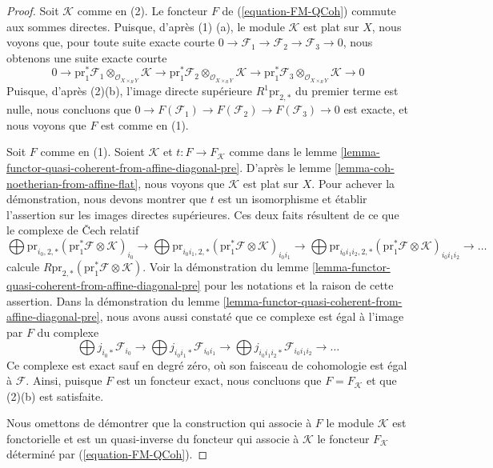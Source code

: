 \begin{proof}
Soit $\mathcal{K}$ comme en (2). Le foncteur $F$ de
(\ref{equation-FM-QCoh}) commute aux sommes directes.
Puisque, d'après (1) (a), le module $\mathcal{K}$ est plat sur $X$,
nous voyons que, pour toute suite exacte courte
$0 \to \mathcal{F}_1 \to \mathcal{F}_2 \to \mathcal{F}_3 \to 0$,
nous obtenons une suite exacte courte
$$
0 \to
\text{pr}_1^*\mathcal{F}_1 \otimes_{\mathcal{O}_{X \times_R Y}} \mathcal{K} \to
\text{pr}_1^*\mathcal{F}_2 \otimes_{\mathcal{O}_{X \times_R Y}} \mathcal{K} \to
\text{pr}_1^*\mathcal{F}_3 \otimes_{\mathcal{O}_{X \times_R Y}} \mathcal{K} \to
0
$$
Puisque, d'après (2)(b), l'image directe supérieure $R^1\text{pr}_{2, *}$
du premier terme est nulle, nous concluons que
$0 \to F(\mathcal{F}_1) \to F(\mathcal{F}_2) \to F(\mathcal{F}_3) \to 0$
est exacte, et nous voyons que $F$ est comme en (1).

\medskip\noindent
Soit $F$ comme en (1). Soient $\mathcal{K}$ et $t : F \to F_\mathcal{K}$ comme
dans le lemme \ref{lemma-functor-quasi-coherent-from-affine-diagonal-pre}.
D'après le lemme \ref{lemma-coh-noetherian-from-affine-flat}, nous voyons
que $\mathcal{K}$ est plat sur $X$. Pour achever la démonstration, nous devons
montrer que $t$ est un isomorphisme et établir l'assertion sur les images
directes supérieures. Ces deux faits résultent de ce que le
complexe de {\v C}ech relatif
$$
\bigoplus 
\text{pr}_{i_0, 2, *}
(\text{pr}_1^*\mathcal{F} \otimes \mathcal{K})_{i_0}
\to
\bigoplus 
\text{pr}_{i_0i_1, 2, *}
(\text{pr}_1^*\mathcal{F} \otimes \mathcal{K})_{i_0i_1}
\to
\bigoplus 
\text{pr}_{i_0i_1i_2, 2, *}
(\text{pr}_1^*\mathcal{F} \otimes \mathcal{K})_{i_0i_1i_2}
\to \ldots
$$
calcule $R\text{pr}_{2, *}(\text{pr}_1^*\mathcal{F} \otimes \mathcal{K})$.
Voir la démonstration du
lemme \ref{lemma-functor-quasi-coherent-from-affine-diagonal-pre}
pour les notations et la raison de cette assertion. Dans la démonstration du
lemme \ref{lemma-functor-quasi-coherent-from-affine-diagonal-pre},
nous avons aussi constaté que ce complexe est égal à l'image par $F$ du complexe
$$
\bigoplus j_{i_0*}\mathcal{F}_{i_0} \to
\bigoplus j_{i_0i_1*}\mathcal{F}_{i_0i_1} \to
\bigoplus j_{i_0i_1i_2*}\mathcal{F}_{i_0i_1i_2} \to \ldots
$$
Ce complexe est exact sauf en degré zéro, où son faisceau de cohomologie
est égal à $\mathcal{F}$. Ainsi, puisque $F$ est un foncteur exact,
nous concluons que $F = F_\mathcal{K}$ et que (2)(b) est satisfaite.

\medskip\noindent
Nous omettons de démontrer que la construction qui associe à $F$
le module $\mathcal{K}$ est fonctorielle et est un quasi-inverse du
foncteur qui associe à $\mathcal{K}$ le foncteur $F_\mathcal{K}$
déterminé par (\ref{equation-FM-QCoh}).
\end{proof}

